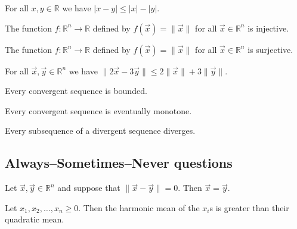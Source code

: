 
\begin{chapex} %
\label{cqRealNumbersTFBegin}
For all $x,y \in \mathbb{R}$ we have $|x-y| \le |x| - |y|$.
\end{chapex}

\begin{chapex} %
The function $f : \mathbb{R}^n \to \mathbb{R}$ defined by $f(\vec x) = \lVert \vec x \rVert$ for all $\vec x \in \mathbb{R}^n$ is injective.
\end{chapex}

\begin{chapex} %
The function $f : \mathbb{R}^n \to \mathbb{R}$ defined by $f(\vec x) = \lVert \vec x \rVert$ for all $\vec x \in \mathbb{R}^n$ is surjective.
\end{chapex}

\begin{chapex} %
For all $\vec x, \vec y \in \mathbb{R}^n$ we have $\lVert 2\vec x - 3\vec y \rVert \le 2\lVert \vec x \rVert + 3\lVert \vec y \rVert$.
\end{chapex}

\begin{chapex} %
Every convergent sequence is bounded.
\end{chapex}

\begin{chapex} %
Every convergent sequence is eventually monotone.
\end{chapex}

\begin{chapex} %
\label{cqRealNumbersTFEnd}
Every subsequence of a divergent sequence diverges.
\end{chapex}

\subsection*{Always--Sometimes--Never questions}


\begin{chapex} %
\label{cqRealNumbersASNBegin}
Let $\vec x, \vec y \in \mathbb{R}^n$ and suppose that $\lVert \vec x - \vec y \rVert = 0$. Then $\vec x = \vec y$.
\end{chapex}

\begin{chapex} %
Let $x_1, x_2, \dots, x_n \ge 0$. Then the harmonic mean of the $x_i$s is greater than their quadratic mean.
\end{chapex}

